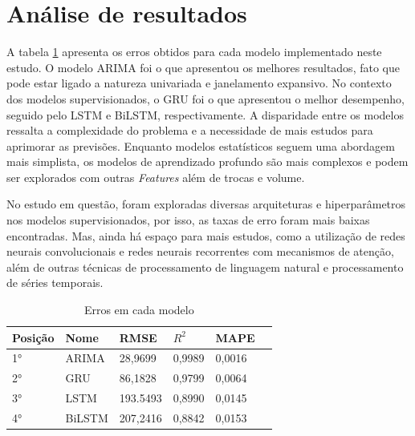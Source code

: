 \section{Análise de resultados}

  A tabela \ref{tab:erros} apresenta os erros obtidos para cada modelo implementado neste estudo. O modelo ARIMA foi o que apresentou os melhores resultados, fato que pode estar ligado a natureza univariada e janelamento expansivo.
  No contexto dos modelos supervisionados, o GRU foi o que apresentou o melhor desempenho, seguido pelo LSTM e BiLSTM, respectivamente.
  A disparidade entre os modelos ressalta a complexidade do problema e a necessidade de mais estudos para aprimorar as previsões.
  Enquanto modelos estatísticos seguem uma abordagem mais simplista, os modelos de aprendizado profundo são mais complexos e podem ser explorados com outras \textit{Features} além de trocas e volume.

  No estudo em questão, foram exploradas diversas arquiteturas e hiperparâmetros nos modelos supervisionados, por isso, as taxas de erro foram mais baixas encontradas. 
  Mas, ainda há espaço para mais estudos, como a utilização de redes neurais convolucionais e redes neurais recorrentes com mecanismos de atenção, além de outras técnicas de processamento de linguagem natural e processamento de séries temporais.
  
\begin{table}[!htb]
  \caption{Erros em cada modelo} \label{tab:erros}
  \begin{tabularx}{\textwidth}{X|X|X|X|X|X}
  \hline
  Posição & Nome & RMSE & $R^2$ & MAPE \\ \hline
  1° & ARIMA   & 28,9699      & 0,9989           & 0,0016             \\ \hline
  2° & GRU   & 86,1828      & 0,9799             & 0,0064             \\ \hline
  3° & LSTM   & 193.5493      &  0,8990           & 0,0145                \\ \hline
  4° & BiLSTM   & 207,2416    & 0,8842            & 0,0153           \\ \hline
  \end{tabularx}
\end{table}